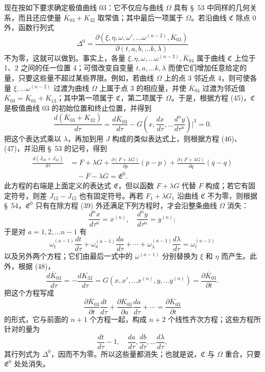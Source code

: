 \documentclass[11pt,a4paper,leqno]{article}
\begin{document}
现在按如下要求确定极值曲线 03：它不仅应与曲线 $\Omega$ 具有 \S~53 中同样的几何关系，而且还应使量 $\overline{K}_{03}+K_{32}$ 取常值；其中最后一项属于 $\Omega$。若沿曲线 $\mathfrak{C}$ 除点 0 外，函数行列式
\[
\Delta^0=
\frac{\partial(\xi,\eta,\omega,\omega',\ldots\omega^{(n-2)},\overline{K}_{03})}
{\partial(t,a,b,\ldots k,\lambda)}
\]
不为零，这就可以做到。事实上，各量 $\xi,\eta,\omega,\ldots\omega^{(n-2)},\overline{K}_{04}$ 属于曲线 $\mathfrak{C}$ 上位于 1、2 之间的任一位置 4；可借改变自变量 $t,a,\ldots k,\lambda$ 而使它们增加任意给定的量，只要这些量不超过某些界限。例如，若曲线 $\Omega$ 上的点 3 邻近点 4，则可使各量 $\xi,\ldots\omega^{(n-2)}$ 过渡为曲线 $\Omega$ 上属于点 3 的相应量，并使 $\overline{K}_{04}$ 过渡为邻近值 $\overline{K}_{03}=\overline{K}_{01}+K_{13}$；其中第一项属于 $\mathfrak{C}$，第二项属于 $\Omega$。于是，根据方程 (45)，$\mathfrak{C}$ 是极值曲线 03 的初始位置和终止位置，并得到
\begin{equation}\tag{48}
\frac{d(\overline{K}_{03}+K_{32})}{d\tau}
=\frac{d\overline{K}_{03}}{d\tau}
-G\left(x,\frac{dx}{d\tau},\ldots\frac{d^ny}{d\tau^n}\right)\bigg|^3=0.
\end{equation}
把这个表达式乘以 $\lambda$，再加到用 $J$ 构成的类似表达式上，则根据方程 (46)、(47)，并沿用 \S~53 的记号，得到
\[
\begin{aligned}
\frac{d(\overline{J}_{03}+J_{32})}{d\tau}
&=F+\lambda G
+\frac{\partial(F+\lambda G)}{\partial p}(\overline{p}-p)
+\frac{\partial(F+\lambda G)}{\partial q}(\overline{q}-q)\\
&\quad-\overline{F}-\lambda\overline{G}
=\mathfrak{E}^0.
\end{aligned}
\]
此方程的右端是上面定义的表达式 $\mathfrak{E}$，但以函数 $F+\lambda G$ 代替 $F$ 构成；若它有固定符号，则差 $J_{12}-\overline{J}_{12}$ 也有固定符号。再若 $F_1+\lambda G_1$ 沿曲线 $\mathfrak{C}$ 不为零，则根据 \S~54，$\mathfrak{E}^0$ 只有在除方程 (39) 外还满足下列方程时，才会沿整条曲线 $\Omega$ 消失：
\[
\frac{d^nx}{d\tau^n}=x^{(n)},\quad
\frac{d^ny}{d\tau^n}=y^{(n)};
\]
于是对 $a=1,2,\ldots n-1$ 有
\[
\omega_t^{(a-1)}\frac{dt}{d\tau}
+\omega_a^{(a-1)}\frac{da}{d\tau}
+\cdots+\omega_\lambda^{(a-1)}\frac{d\lambda}{d\tau}
=\omega_t^{(a-1)}
\]
以及另外两个方程；它们由最后一式中的 $\omega^{(a-1)}$ 分别替换为 $\xi$ 和 $\eta$ 而产生。此外，根据 (48)，
\[
\frac{d\overline{K}_{03}}{d\tau}
=-\frac{dK_{32}}{d\tau}
=G(x,x',\ldots x^{(n)},y,\ldots y^{(n)})
=\frac{\partial\overline{K}_{03}}{\partial t}.
\]
把这个方程写成
\[
\frac{\partial\overline{K}_{03}}{\partial t}\frac{dt}{d\tau}
+\frac{\partial\overline{K}_{03}}{\partial a}\frac{da}{d\tau}
+\cdots
=\frac{\partial\overline{K}_{03}}{\partial t}
\]
的形式，它与前面的 $n+1$ 个方程一起，构成 $n+2$ 个线性齐次方程；这些方程所针对的量为
\[
\frac{dt}{d\tau}-1,\quad \frac{da}{d\tau},\frac{db}{d\tau},\ldots\frac{d\lambda}{d\tau},
\]
其行列式为 $\Delta^0$，因而不为零。所以这些量都消失；也就是说，$\mathfrak{C}$ 与 $\Omega$ 重合，只要 $\mathfrak{E}^0$ 处处消失。
\end{document}

